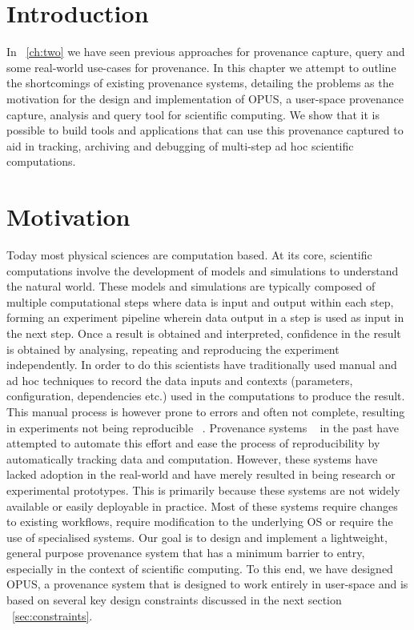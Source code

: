 \documentclass[withindex,glossary]{cam-thesis}
\begin{document}
\section{Introduction}
In ~\ref{ch:two} we have seen previous approaches for provenance capture, query and some real-world use-cases for provenance. In this chapter we attempt to outline the shortcomings of existing provenance systems, detailing the problems as the motivation for the design and implementation of OPUS, a user-space provenance capture, analysis and query tool for scientific computing. We show that it is possible to build tools and applications that can use this provenance captured to aid in tracking, archiving and debugging of multi-step ad hoc scientific computations.

\section{Motivation}
Today most physical sciences are computation based.
At its core, scientific computations involve the development of models and simulations to understand the natural world. 
These models and simulations are typically composed of multiple computational steps where data is input and output within each step, forming an experiment pipeline wherein data output in a step is used as input in the next step.
Once a result is obtained and interpreted, confidence in the result is obtained by analysing, repeating and reproducing the experiment independently.
In order to do this scientists have traditionally used manual and ad hoc techniques to record the data inputs and contexts (parameters, configuration, dependencies etc.) used in the computations to produce the result.
This manual process is however prone to errors and often not complete, resulting in experiments not being reproducible ~\cite{non-rep, nature}. 
Provenance systems ~\cite{PASS, BURRITO, StoyBook} in the past have attempted to automate this effort and ease the process of reproducibility by automatically tracking data and computation.
However, these systems have lacked adoption in the real-world and have merely resulted in being research or experimental prototypes.
This is primarily because these systems are not widely available or easily deployable in practice.
Most of these systems require changes to existing workflows, require modification to the underlying OS or require the use of specialised systems.
Our goal is to design and implement a lightweight, general purpose provenance system that has a minimum barrier to entry, especially in the context of scientific computing.
To this end, we have designed OPUS, a provenance system that is designed to work entirely in user-space and is based on several key design constraints discussed in the next section ~\ref{sec:constraints}.
\end{document}
